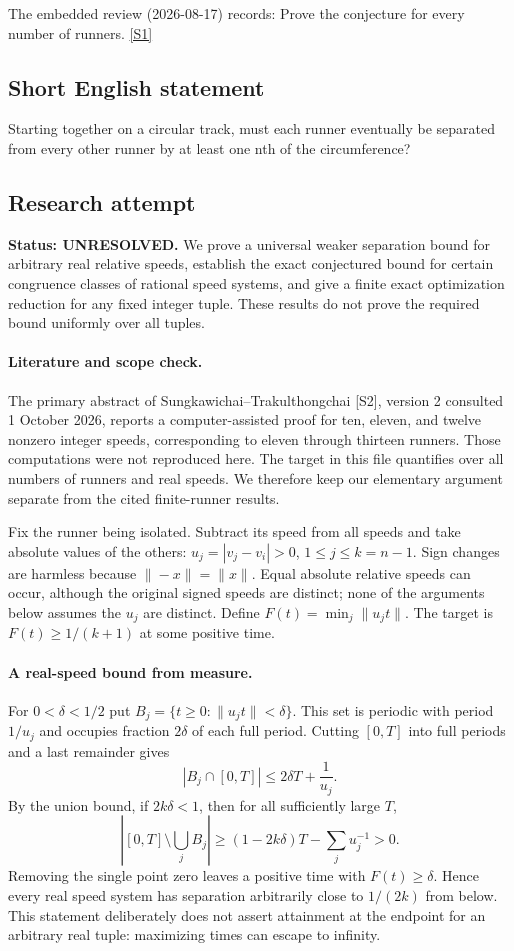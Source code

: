 \documentclass[11pt,a4paper]{article}
\newcommand{\sref}[2]{\hyperlink{source:#1:#2}{[S#2]}}
\begin{document}
The embedded review (2026-08-17) records: Prove the conjecture for every number of runners. \sref{statement}{1}

\subsection{Short English statement}

Starting together on a circular track, must each runner eventually be separated from every other runner by at least one nth of the circumference?

\subsection{Research attempt}
\textbf{Status: UNRESOLVED.} We prove a universal weaker separation bound for arbitrary real relative speeds, establish the exact conjectured bound for certain congruence classes of rational speed systems, and give a finite exact optimization reduction for any fixed integer tuple. These results do not prove the required bound uniformly over all tuples.

\paragraph{Literature and scope check.}
The primary abstract of Sungkawichai--Trakulthongchai [S2], version 2 consulted 1 October 2026, reports a computer-assisted proof for ten, eleven, and twelve nonzero integer speeds, corresponding to eleven through thirteen runners. Those computations were not reproduced here. The target in this file quantifies over all numbers of runners and real speeds. We therefore keep our elementary argument separate from the cited finite-runner results.

Fix the runner being isolated. Subtract its speed from all speeds and take absolute values of the others: $u_j=|v_j-v_i|>0$, $1\le j\le k=n-1$. Sign changes are harmless because $\|-x\|=\|x\|$. Equal absolute relative speeds can occur, although the original signed speeds are distinct; none of the arguments below assumes the $u_j$ are distinct. Define $F(t)=\min_j\|u_jt\|$. The target is $F(t)\ge1/(k+1)$ at some positive time.

\paragraph{A real-speed bound from measure.}
For $0<\delta<1/2$ put $B_j=\{t\ge0:\|u_jt\|<\delta\}$. This set is periodic with period $1/u_j$ and occupies fraction $2\delta$ of each full period. Cutting $[0,T]$ into full periods and a last remainder gives
\[
|B_j\cap[0,T]|\le 2\delta T+\frac1{u_j}.
\]
By the union bound, if $2k\delta<1$, then for all sufficiently large $T$,
\[
\left|[0,T]\setminus\bigcup_j B_j\right|
\ge(1-2k\delta)T-\sum_j u_j^{-1}>0.
\]
Removing the single point zero leaves a positive time with $F(t)\ge\delta$. Hence every real speed system has separation arbitrarily close to $1/(2k)$ from below. This statement deliberately does not assert attainment at the endpoint for an arbitrary real tuple: maximizing times can escape to infinity.
\end{document}
